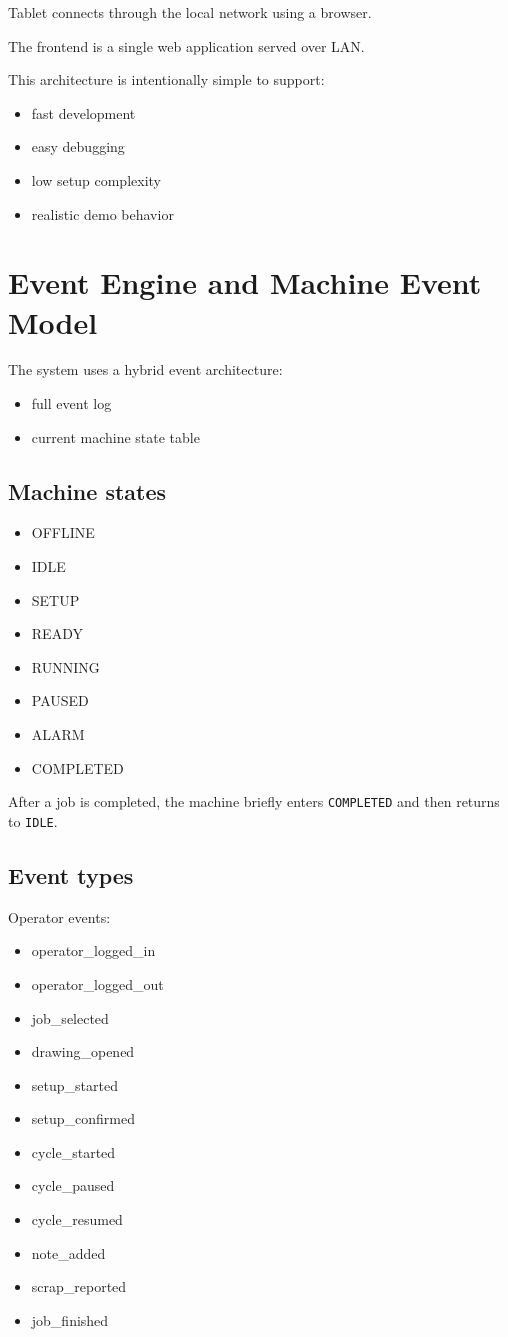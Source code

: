 \documentclass[11pt]{article}
\begin{document}
Tablet connects through the local network using a browser.

The frontend is a single web application served over LAN.

This architecture is intentionally simple to support:
\begin{itemize}
\item fast development
\item easy debugging
\item low setup complexity
\item realistic demo behavior
\end{itemize}

\section{Event Engine and Machine Event Model}
The system uses a hybrid event architecture:
\begin{itemize}
\item full event log
\item current machine state table
\end{itemize}

\subsection{Machine states}
\begin{itemize}
\item OFFLINE
\item IDLE
\item SETUP
\item READY
\item RUNNING
\item PAUSED
\item ALARM
\item COMPLETED
\end{itemize}

After a job is completed, the machine briefly enters \texttt{COMPLETED} and then returns to \texttt{IDLE}.

\subsection{Event types}
Operator events:
\begin{itemize}
\item operator\_logged\_in
\item operator\_logged\_out
\item job\_selected
\item drawing\_opened
\item setup\_started
\item setup\_confirmed
\item cycle\_started
\item cycle\_paused
\item cycle\_resumed
\item note\_added
\item scrap\_reported
\item job\_finished
\end{itemize}
\end{document}
